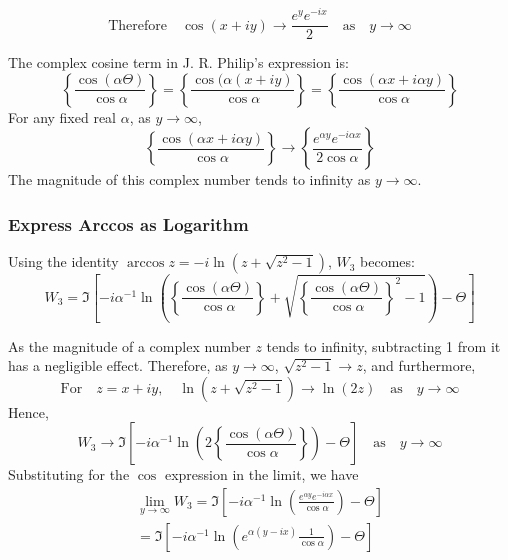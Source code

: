 \documentclass[a4paper]{report}
\begin{document}
\begin{equation}
\text{Therefore} \quad \cos (x + iy) \to  \frac{e^{y} e^{-ix}}{2}
\quad \text{as} \quad y \to \infty
\end{equation}


The complex cosine term in J. R. Philip's expression is:
\begin{equation}
\left\{ \frac{\cos(\alpha \Theta)}{\cos \alpha} \right\} = 
\left\{ \frac{\cos(\alpha(x + iy)}{\cos \alpha} \right\} =
\left\{ \frac{\cos(\alpha x + i \alpha y)}{\cos \alpha} \right\}
\end{equation}
For any fixed real $\alpha$, as $y \to \infty$,
\begin{equation}
\left\{ \frac{\cos(\alpha x + i \alpha y)}{\cos \alpha} \right\} \to
\left\{ \frac{ e^{\alpha y} e^{-i\alpha x} }{2 \cos \alpha} \right\}
\end{equation}
The magnitude of this complex number tends to infinity as $y \to \infty$.

\subsubsection*{Express Arccos as Logarithm}

Using the identity $\arccos z = - i \ln (z + \sqrt{z^{2} - 1})$, $W_{3}$ becomes:
\begin{equation}
 W_{3} = \Im \left[  
 - i \alpha^{-1} \ln \left(
 \left\{ \frac{\cos(\alpha \Theta)}{\cos \alpha} \right\}
 + \sqrt{\left\{ \frac{\cos(\alpha \Theta)}{\cos \alpha} \right\}^{2} - 1} \right) 
  - \Theta  \right]
\end{equation}

As the magnitude of a complex number $z$ tends to infinity, subtracting 1 from it has a negligible effect. Therefore, as $y \to \infty$, $\sqrt{z^2 - 1} \to z$, and furthermore,
\begin{equation}
\text{For} \quad z = x + iy, \quad \ln(z + \sqrt{z^2 - 1}) \to \ln(2z)
\quad \text{as} \quad y \to \infty
\end{equation}
Hence,
\begin{equation}
W_3 \to 
\Im \left[  
 - i \alpha^{-1} \ln \left( 2
 \left\{ \frac{\cos(\alpha \Theta)}{\cos \alpha} \right\} \right) 
  - \Theta  \right]
\quad
\text{as}
\quad y \to \infty 
\end{equation}
Substituting for the $\cos$ expression in the limit, we have
\begin{align}
\lim_{y \to \infty} W_3 =
 \Im \left[  
 - i \alpha^{-1} \ln \left(
\frac{ e^{\alpha y} e^{-i\alpha x} }{\cos \alpha}
 \right) 
  - \Theta  \right] 
\\
 =
 \Im \left[  
 - i \alpha^{-1} \ln \left( e^{\alpha (y - ix)}
\frac{ 1 }{\cos \alpha}
 \right) 
  - \Theta  \right] 
\end{align}
\end{document}
